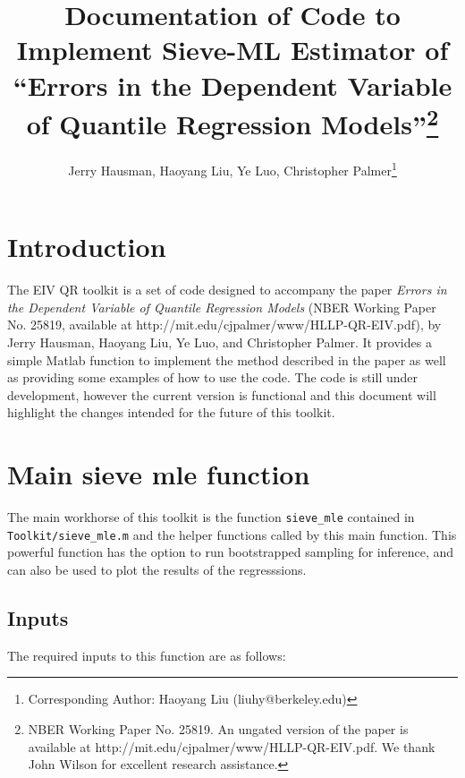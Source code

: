 \documentclass[12pt]{article}
\title{Documentation of Code to Implement Sieve-ML Estimator of ``Errors in the Dependent Variable of Quantile Regression Models''\footnote{NBER Working Paper No. 25819. An ungated version of the paper is available at http://mit.edu/cjpalmer/www/HLLP-QR-EIV.pdf. We thank John Wilson for excellent research assistance.}}
\author{Jerry Hausman, Haoyang Liu, Ye Luo, Christopher Palmer\footnote{Corresponding Author: Haoyang Liu (liuhy@berkeley.edu)}}
\begin{document}
\nocite{*}
\maketitle

\tableofcontents

\newpage

\section{Introduction}

The EIV QR toolkit is a set of code designed to accompany the paper \textit{Errors in the Dependent Variable of Quantile Regression Models} (NBER Working Paper No. 25819, available at http://mit.edu/cjpalmer/www/HLLP-QR-EIV.pdf), by Jerry Hausman, Haoyang Liu, Ye Luo, and Christopher Palmer. It provides a simple Matlab function to implement the method described in the paper as well as providing some examples of how to use the code. The code is still under development, however the current version is functional and this document will highlight the changes intended for the future of this toolkit.

\section{Main sieve mle function}

The main workhorse of this toolkit is the function \lstinline{sieve_mle} contained in \lstinline{Toolkit/sieve_mle.m} and the helper functions called by this main function. This powerful function has the option to run bootstrapped sampling for inference, and can also be used to plot the results of the regresssions.

\subsection{Inputs}

The required inputs to this function are as follows:
\end{document}
